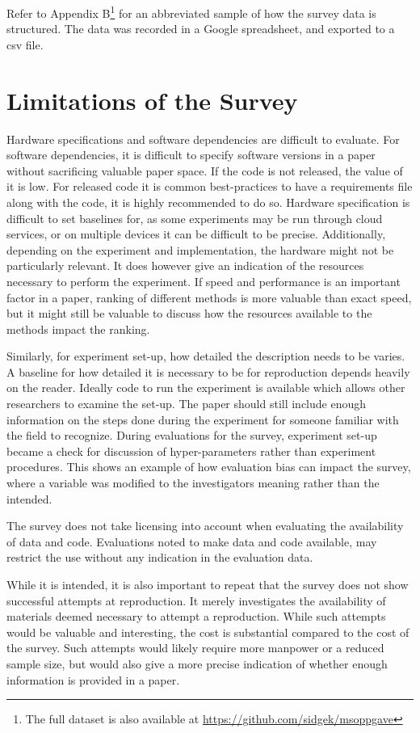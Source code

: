 Refer to Appendix B\footnote{The full dataset is also available at \url{https://github.com/sidgek/msoppgave}} for an abbreviated sample of how the survey data is structured. The data was recorded in a Google spreadsheet, and exported to a csv file.

\section{Limitations of the Survey}
Hardware specifications and software dependencies are difficult to evaluate. For software dependencies, it is difficult to specify software versions in a paper without sacrificing valuable paper space. If the code is not released, the value of it is low. For released code it is common best-practices to have a requirements file along with the code, it is highly recommended to do so. Hardware specification is difficult to set baselines for, as some experiments may be run through cloud services, or on multiple devices it can be difficult to be precise. Additionally, depending on the experiment and implementation, the hardware might not be particularly relevant. It does however give an indication of the resources necessary to perform the experiment. If speed and performance is an important factor in a paper, ranking of different methods is more valuable than exact speed, but it might still be valuable to discuss how the resources available to the methods impact the ranking.

Similarly, for experiment set-up, how detailed the description needs to be varies. A baseline for how detailed it is necessary to be for reproduction depends heavily on the reader. Ideally code to run the experiment is available which allows other researchers to examine the set-up. The paper should still include enough information on the steps done during the experiment for someone familiar with the field to recognize. During evaluations for the survey, experiment set-up became a check for discussion of hyper-parameters rather than experiment procedures. This shows an example of how evaluation bias can impact the survey, where a variable was modified to the investigators meaning rather than the intended.

The survey does not take licensing into account when evaluating the availability of data and code. Evaluations noted to make data and code available, may restrict the use without any indication in the evaluation data.

While it is intended, it is also important to repeat that the survey does not show successful attempts at reproduction. It merely investigates the availability of materials deemed necessary to attempt a reproduction. While such attempts would be valuable and interesting, the cost is substantial compared to the cost of the survey. Such attempts would likely require more manpower or a reduced sample size, but would also give a more precise indication of whether enough information is provided in a paper.
\cleardoublepage
